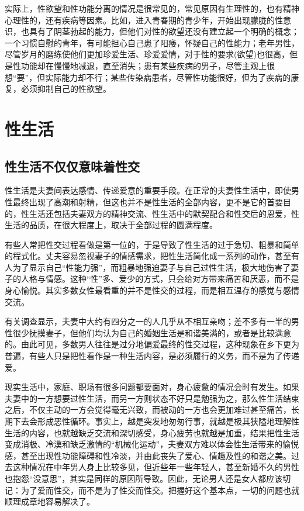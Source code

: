 \documentclass[12pt,UTF8]{ctexbook}
\begin{document}
实际上，性欲望和性功能分离的情况是很常见的，常见原因有生理性的，也有精神心理性的，还有疾病等因素。比如，进入青春期的青少年，开始出现朦胧的性意识，也具有了阴茎勃起的能力，但他们对性的欲望还没有建立起一个明确的概念；一个习惯自慰的青年，有可能担心自己患了阳痿，怀疑自己的性能力；老年男性，尽管岁月的磨练使他们更加珍爱生活、珍爱爱情，对于性的要求(欲望)也很高，但是性功能却在慢慢地减退，直至消失；患有某些疾病的男子，尽管主观上很想“要”，但实际能力却不行；某些传染病患者，尽管性功能很好，但为了疾病的康复，必须抑制自己的性欲望。

\part{性生活}

\chapter{性生活不仅仅意味着性交}

性生活是夫妻间表达感情、传递爱意的重要手段。在正常的夫妻性生活中，即使男性最终出现了高潮和射精，但这也并不是性生活的全部内容，更不是它的首要目的，性生活还包括夫妻双方的精神交流、性生活中的默契配合和性交后的恩爱，性生活的品质，在很大程度上，取决于全部过程的圆满程度。

有些人常把性交过程看做是第一位的，于是导致了性生活的过于急切、粗暴和简单的程式化。丈夫容易忽视妻子的情感需求，把性生活简化成一系列的动作，甚至有人为了显示自己“性能力强”，而粗暴地强迫妻子与自己过性生活，极大地伤害了妻子的人格与情感。这种“性”多、爱少的方式，只会给对方带来痛苦和厌恶，而不是身心愉悦。其实多数女性最看重的并不是性交的过程，而是相互温存的感觉与感情交流。

有关调查显示，夫妻中大约有四分之一的人几乎从不相互亲吻；差不多有一半的男性很少抚摸妻子，但他们均认为自己的婚姻生活是和谐美满的，或者是比较满意的。由此可见，多数男人往往是过分地偏爱最终的性交过程，这种现象在乡下更为普遍，有些人只是把性看作是一种生活内容，是必须履行的义务，而不是为了传递爱。

现实生活中，家庭、职场有很多问题都要面对，身心疲惫的情况会时有发生。如果夫妻中的一方想要过性生活，而另一方则状态不好只是勉强为之，那么性生活结束之后，不仅主动的一方会觉得毫无兴致，而被动的一方也会更加难过甚至痛苦，长期下去会形成恶性循环。事实上，越是突发地匆匆行事，就越是极其狭隘地理解性生活的内容，也就越缺乏交流和深切感受，身心疲劳也就越是加重，结果把性生活变成消极、冷漠和缺乏激情的“机械化运动”，夫妻双方难以体会性生活带来的愉悦感，甚至出现性功能障碍和性冷淡，并由此丧失了爱心、情趣及性的和谐之美。过去这种情况在中年男人身上比较多见，但近些年一些年轻人，甚至新婚不久的男性也抱怨“没意思”，其实是同样的原因所导致。因此，无论男人还是女人都应该切记：为了爱而性交，而不是为了性交而性交。把握好这个基本点，一切的问题也就顺理成章地容易解决了。
\end{document}
